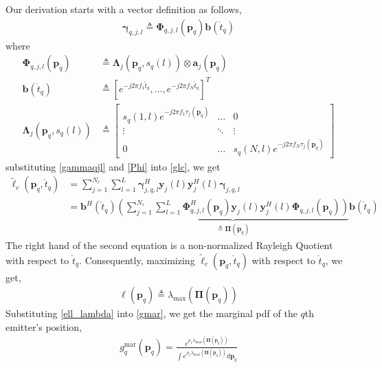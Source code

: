 \documentclass[review]{elsarticle}
\begin{document}
Our derivation starts with a vector definition as follows,
\begin{align}\label{gammaqjl}
    \boldsymbol{\gamma}_{q,j,l}\triangleq\boldsymbol{\Phi}_{q,j,l}(\boldsymbol{p}_q)\boldsymbol{b}(\mathring{t}_q)
\end{align}
where
\begin{align}\label{Phi}
    \boldsymbol{\Phi}_{q,j,l}(\boldsymbol{p}_q)&\triangleq\boldsymbol{\Lambda}_j(\boldsymbol{p}_q,s_q(l))\otimes \boldsymbol{a}_j(\boldsymbol{p}_q)\\
    \boldsymbol{b}(\mathring{t}_q)&\triangleq[e^{-j2\pi f_1\mathring{t}_q},...,e^{-j2\pi f_N\mathring{t}_q}]^T\\
    \boldsymbol{\Lambda}_j(\boldsymbol{p}_q,s_q(l))&\triangleq 
    \left[ 
    \begin{array}{ccc}
        s_q(1,l)e^{-j2\pi f_1\tau_j(\boldsymbol{p}_q)}& \ldots & 0\\
        \vdots&\ddots&\vdots\\
        0&\ldots&s_q(N,l)e^{-j2\pi f_N\tau_j(\boldsymbol{p}_q)}
    \end{array}
    \right ]   
\end{align}
substituting \eqref{gammaqjl} and \eqref{Phi} into \eqref{glc}, we get
\begin{align}
    \tilde{\ell}_c(\boldsymbol{p}_q,\mathring{t}_q)&= \sum_{j=1}^{N_r} \sum_{l=1}^{L} \boldsymbol{\gamma}_{j,q,l}^H\boldsymbol{y}_j(l)\boldsymbol{y}_j^H(l)\boldsymbol{\gamma}_{j,q,l}\\
    &=\boldsymbol{b}^H(\mathring{t}_q)\underbrace{\left(\sum_{j=1}^{N_r} \sum_{l=1}^{L} \boldsymbol{\Phi}^H_{q,j,l}(\boldsymbol{p}_q)\boldsymbol{y}_j(l)\boldsymbol{y}_j^H(l)\boldsymbol{\Phi}_{q,j,l}(\boldsymbol{p}_q)\right)}_{\triangleq\boldsymbol{\Pi}(\boldsymbol{p}_q)} \boldsymbol{b}(\mathring{t}_q)
\end{align}
The right hand of the second equation is a non-normalized Rayleigh Quotient with respect to $\mathring{t}_q$. Consequently, maximizing $\tilde{\ell}_c(\boldsymbol{p}_q,\mathring{t}_q)$ with respect to $\mathring{t}_q$, we get,
\begin{align}\label{ell_lambda}
    \ell(\boldsymbol{p}_q)\triangleq\lambda_{\text{max}}(\boldsymbol{\Pi}(\boldsymbol{p}_q))
\end{align}
Substituting \eqref{ell_lambda} into \eqref{gmar}, we get the marginal pdf of the $q$th emitter's position,
\begin{align}\label{gpq}
    g_{q}^{\text{mar}}(\boldsymbol{p}_q)=\frac{e^{\rho_1\lambda_{\text{max}}(\boldsymbol{\Pi}(\boldsymbol{p}_q))}}{\int e^{\rho_1\lambda_{\text{max}}(\boldsymbol{\Pi}(\boldsymbol{p}_q))} d\boldsymbol{p}_q}
\end{align}
\end{document}
